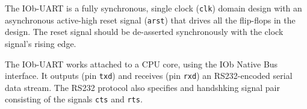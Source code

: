 %

The IOb-UART is a fully synchronous, single clock ({\tt clk}) domain
design with an asynchronous active-high reset signal ({\tt arst}) that drives
all the flip-flops in the design. The reset signal should be de-asserted
synchronously with the clock signal's rising edge.

The IOb-UART works attached to a CPU core, using the IOb Native Bus
interface. It outputs (pin {\tt txd}) and receives (pin {\tt rxd}) an
RS232-encoded serial data stream. The RS232 protocol also specifies and
handshking signal pair consisting of the signals {\tt cts} and {\tt rts}.

